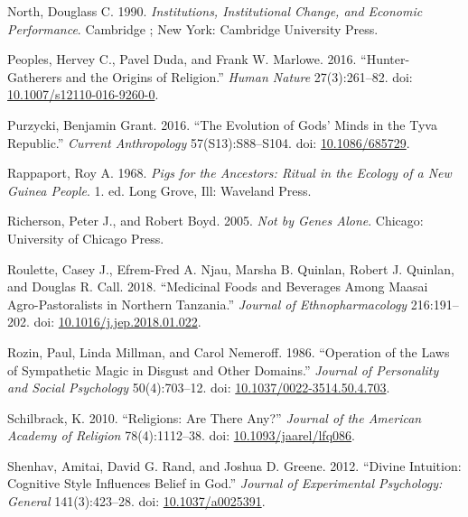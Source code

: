 \documentclass[
  11pt,
]{article}
\begin{document}
\leavevmode\hypertarget{ref-northInstitutionsInstitutionalChange1990}{}%
North, Douglass C. 1990. \emph{Institutions, Institutional Change, and Economic Performance}. Cambridge ; New York: Cambridge University Press.

\leavevmode\hypertarget{ref-peoplesHunterGatherersOriginsReligion2016}{}%
Peoples, Hervey C., Pavel Duda, and Frank W. Marlowe. 2016. ``Hunter-Gatherers and the Origins of Religion.'' \emph{Human Nature} 27(3):261--82. doi: \href{https://doi.org/10.1007/s12110-016-9260-0}{10.1007/s12110-016-9260-0}.

\leavevmode\hypertarget{ref-purzyckiEvolutionGodsMinds2016}{}%
Purzycki, Benjamin Grant. 2016. ``The Evolution of Gods' Minds in the Tyva Republic.'' \emph{Current Anthropology} 57(S13):S88--S104. doi: \href{https://doi.org/10.1086/685729}{10.1086/685729}.

\leavevmode\hypertarget{ref-rappaportPigsAncestorsRitual1968}{}%
Rappaport, Roy A. 1968. \emph{Pigs for the Ancestors: Ritual in the Ecology of a New Guinea People}. 1. ed. Long Grove, Ill: Waveland Press.

\leavevmode\hypertarget{ref-richersonNotGenesAlone2005}{}%
Richerson, Peter J., and Robert Boyd. 2005. \emph{Not by Genes Alone}. Chicago: University of Chicago Press.

\leavevmode\hypertarget{ref-rouletteMedicinalFoodsBeverages2018}{}%
Roulette, Casey J., Efrem-Fred A. Njau, Marsha B. Quinlan, Robert J. Quinlan, and Douglas R. Call. 2018. ``Medicinal Foods and Beverages Among Maasai Agro-Pastoralists in Northern Tanzania.'' \emph{Journal of Ethnopharmacology} 216:191--202. doi: \href{https://doi.org/10.1016/j.jep.2018.01.022}{10.1016/j.jep.2018.01.022}.

\leavevmode\hypertarget{ref-rozinOperationLawsSympathetic1986}{}%
Rozin, Paul, Linda Millman, and Carol Nemeroff. 1986. ``Operation of the Laws of Sympathetic Magic in Disgust and Other Domains.'' \emph{Journal of Personality and Social Psychology} 50(4):703--12. doi: \href{https://doi.org/10.1037/0022-3514.50.4.703}{10.1037/0022-3514.50.4.703}.

\leavevmode\hypertarget{ref-schilbrackReligionsAreThere2010}{}%
Schilbrack, K. 2010. ``Religions: Are There Any?'' \emph{Journal of the American Academy of Religion} 78(4):1112--38. doi: \href{https://doi.org/10.1093/jaarel/lfq086}{10.1093/jaarel/lfq086}.

\leavevmode\hypertarget{ref-shenhavDivineIntuitionCognitive2012}{}%
Shenhav, Amitai, David G. Rand, and Joshua D. Greene. 2012. ``Divine Intuition: Cognitive Style Influences Belief in God.'' \emph{Journal of Experimental Psychology: General} 141(3):423--28. doi: \href{https://doi.org/10.1037/a0025391}{10.1037/a0025391}.
\end{document}
